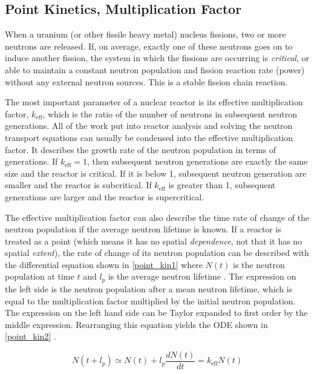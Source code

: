 \subsection{Point Kinetics, Multiplication Factor}

When a uranium (or other fissile heavy metal) nucleus fissions, two or more neutrons are released.  If, on average, exactly one of these neutrons goes on to induce another fission, the system in which the fissions are occurring is \emph{critical}, or able to maintain a constant neutron population and fission reaction rate (power) without any external neutron sources.  This is a stable fission chain reaction.

The most important parameter of a nuclear reactor is its effective multiplication factor, $k_\mathrm{eff}$, which is the ratio of the number of neutrons in subsequent neutron generations.  All of the work put into reactor analysis and solving the neutron transport equations can usually be condensed into the effective multiplication factor.  It describes the growth rate of the neutron population in terms of generations.  If $k_\mathrm{eff}=1$, then subsequent neutron generations are exactly the same size and the reactor is critical.  If it is below 1, subsequent neutron generation are smaller and the reactor is subcritical.  If $k_\mathrm{eff}$ is greater than 1, subsequent generations are larger and the reactor is supercritical.  

The effective multiplication factor can also describe the time rate of change of the neutron population if the average neutron lifetime is known.  If a reactor is treated as a point (which means it has no spatial \emph{dependence}, not that it has no spatial \emph{extent}), the rate of change of its neutron population can be described with the differential equation shown in \eqref{point_kin1} where $N(t)$ is the neutron population at time $t$ and $l_p$ is the average neutron lifetime \cite{duderstadt}.  The expression on the left side is the neutron population after a mean neutron lifetime, which is equal to the multiplication factor multiplied by the initial neutron population.  The expression on the left hand side can be Taylor expanded to first order by the middle expression.  Rearranging this equation yields the ODE shown in  \eqref{point_kin2} \cite{duderstadt}.

\begin{equation}
\label{point_kin1}
N(t+l_p) \simeq N(t)+l_p \frac{dN(t)}{dt} = k_\mathrm{eff} N(t) 
\end{equation}

